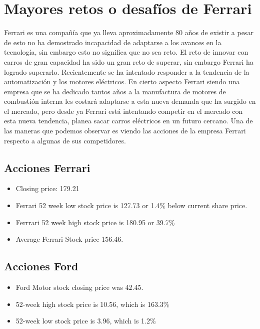 \documentclass{article}
\begin{document}
\section{Mayores retos o desafíos de Ferrari}
Ferrari es una compañía que ya lleva aproximadamente 80 años de existir a pesar de esto no ha demostrado incapacidad de adaptarse a los avances en la tecnología, sin embargo esto no significa que no sea reto. El reto de innovar con carros de gran capacidad ha sido un gran reto de superar, sin embargo Ferrari ha logrado superarlo. Recientemente se ha intentado responder a la tendencia de la automatización y los motores eléctricos. En cierto aspecto Ferrari siendo una empresa que se ha dedicado tantos años a la manufactura de motores de combustión interna les costará adaptarse a esta nueva demanda que ha surgido en el mercado, pero desde ya Ferrari está intentando competir en el mercado con esta nueva tendencia, planea sacar carros eléctricos en un futuro cercano. Una de las maneras que podemos observar es viendo las acciones de la empresa Ferrari respecto a algunas de sus competidores. 
\subsection*{Acciones Ferrari}
\begin{itemize}
    \item Closing price: 179.21 
    \item Ferrari 52 week low stock price is 127.73 or 1.4\% below current share price.
    \item Ferrrari 52 week high stock price is 180.95 or 39.7\% 
    \item Average Ferrari Stock price 156.46.
\end{itemize}

\subsection*{Acciones Ford}
\begin{itemize}
    \item Ford Motor stock closing price was 42.45.
    \item 52-week high stock price is 10.56, which is 163.3\%
    \item 52-week low stock price is 3.96, which is 1.2\%
\end{itemize}
\end{document}
